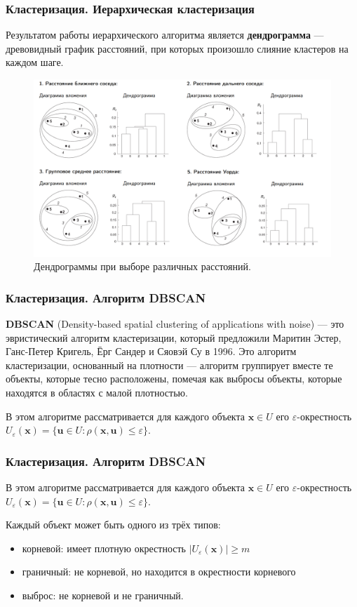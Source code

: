 \documentclass[ucs, notheorems, handout]{beamer}
\begin{document}
	\begin{frame}
	\frametitle{Кластеризация. Иерархическая кластеризация}
	Результатом работы иерархического алгоритма является \textbf{дендрограмма} 
--- древовидный график расстояний, при которых произошло слияние кластеров на каждом шаге.
\begin{figure}[H]
	\centering
	\includegraphics[scale=0.15]{hier.png}
	\caption{Дендрограммы при выборе различных расстояний.}
\end{figure}
	\end{frame}
	
	\begin{frame}
	\frametitle{Кластеризация. Алгоритм DBSCAN}
	\textbf{DBSCAN} (Density-based spatial clustering of applications with noise) --- это эвристический алгоритм кластеризации, который предложили Маритин Эстер, Ганс-Петер Кригель, Ёрг Сандер и Сяовэй Су в 1996. Это алгоритм кластеризации, основанный на плотности --- алгоритм группирует вместе те объекты, которые тесно расположены, помечая как выбросы объекты, которые находятся в областях с малой плотностью.

	
В этом алгоритме рассматривается для каждого объекта $\pmb x \in U$ его $\varepsilon$-окрестность $U_\varepsilon (\pmb x) = \{\pmb u \in U : \rho(\pmb x , \pmb u ) \leq \varepsilon\}$.
	\end{frame}
	
	\begin{frame}
	\frametitle{Кластеризация. Алгоритм DBSCAN}
	В этом алгоритме рассматривается для каждого объекта $\pmb x \in U$ его $\varepsilon$-окрестность $U_\varepsilon (\pmb x) = \{\pmb u \in U : \rho(\pmb x , \pmb u ) \leq \varepsilon\}$.
	
Каждый объект может быть одного из трёх типов:
	\begin{itemize}
		\item корневой: имеет плотную окрестность $|U_\varepsilon (\pmb x)| \geq m$ 
		\item граничный: не корневой, но находится в окрестности корневого 
		\item выброс: не корневой и не граничный. 
	\end{itemize}
	\end{frame}
	
\end{document}
